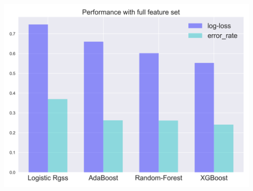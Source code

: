 \documentclass[landscape,final,a0paper,fontscale=0.285]{baposter}
\begin{document}
\begin{poster}
{  { \centering\includegraphics[width=0.95\linewidth]{images/compare_result.png}}\vspace{-0.5em}
  
}
\end{poster}
\end{document}
